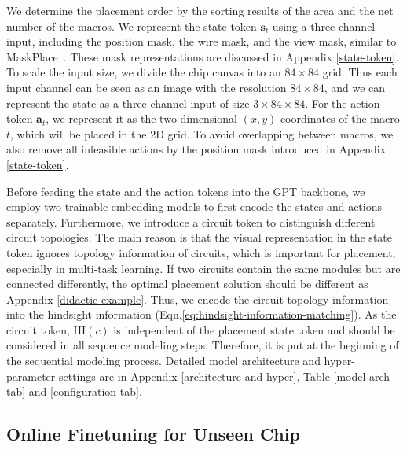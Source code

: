 \documentclass{article}
\newcommand{\bs}{\bm{s}}
\newcommand{\ba}{\bm{a}}
\newcommand{\bc}{{c}}
\theoremstyle{plain}
\theoremstyle{definition}
\theoremstyle{remark}
\begin{document}
We determine the placement order
by the sorting results of the area and the net number of the macros. 
We represent the state token $\bs_t$ using a three-channel input, including the position mask, the wire mask, and the view mask, similar to MaskPlace~\citep{lai2022maskplace}. These mask representations are discussed in Appendix \ref{state-token}. To scale the input size, we divide the chip canvas into an $84\times 84$ grid. Thus each input channel can be seen as an image with the resolution $84\times 84$, and we can represent the state as a three-channel input of size $3\times84\times 84$. 
For the action token $\ba_t$, we represent it as the two-dimensional $(x,y)$ coordinates of the macro $t$, which will be placed in the 2D grid. To avoid overlapping between macros, we also remove all infeasible actions by the position mask introduced in Appendix \ref{state-token}.

Before feeding the state and the action tokens into the GPT backbone, we employ 
two trainable embedding models to first encode the states and actions separately. 
Furthermore, we introduce a circuit token to distinguish different circuit topologies. The main reason is that the visual representation in the state token ignores topology information of circuits, which is important for  placement, especially in multi-task learning. If two circuits contain the same modules but are connected differently, the optimal placement solution should be different as Appendix \ref{didactic-example}. Thus, we encode the circuit topology information into the hindsight information (Eqn.\eqref{eq:hindsight-information-matching}). 
As the circuit token, $\text{HI}(\bc)$ is independent of the placement state token and should be considered in all sequence modeling steps. Therefore, it is put at the beginning of the sequential modeling process.  Detailed model architecture and hyper-parameter settings are in Appendix \ref{architecture-and-hyper}, Table \ref{model-arch-tab} and \ref{configuration-tab}.


\subsection{Online Finetuning for Unseen Chip}
\label{sec:online-finetune}
\end{document}
